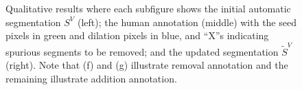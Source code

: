 \documentclass[]{spie}  %
\begin{document}
\begin{figure}[htbp]
 \hspace{1em}

\caption{Qualitative results where each subfigure shows the initial
  automatic segmentation $S^V$ (left); the human annotation (middle)
  with the seed pixels in green and dilation pixels in blue, and
  ``X''s indicating spurious segments to be removed; and the updated
  segmentation $\tilde{S}^V$ (right).  Note that (f) and (g)
  illustrate removal annotation and the remaining illustrate addition
  annotation.}
\label{fig:qual}
\end{figure}
\end{document}
